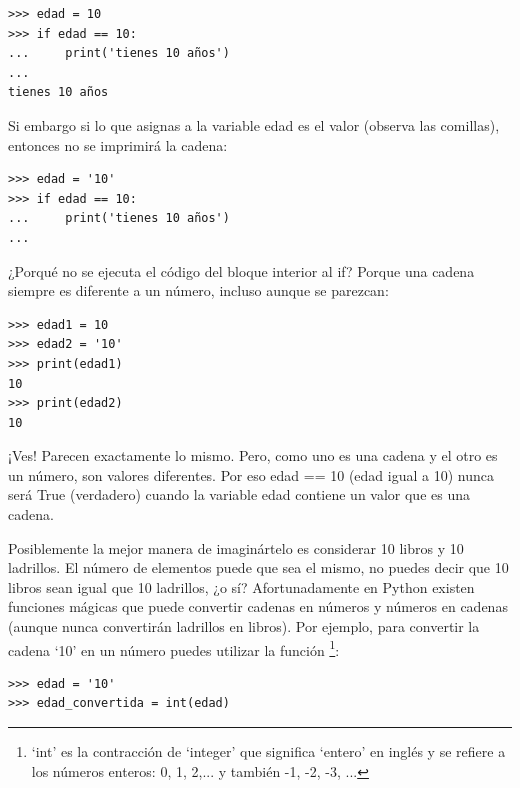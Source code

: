 \begin{listing}
\begin{verbatim}
>>> edad = 10
>>> if edad == 10:
...     print('tienes 10 años')
...
tienes 10 años
\end{verbatim}
\end{listing}

Si embargo si lo que asignas a la variable edad es el valor  (observa las comillas), entonces no se imprimirá la cadena:

\begin{listing}
\begin{verbatim}
>>> edad = '10'
>>> if edad == 10:
...     print('tienes 10 años')
...
\end{verbatim}
\end{listing}

¿Porqué no se ejecuta el código del bloque interior al if?  Porque una cadena siempre es diferente a un número, incluso aunque se parezcan:

\begin{listing}
\begin{verbatim}
>>> edad1 = 10
>>> edad2 = '10'
>>> print(edad1)
10
>>> print(edad2)
10
\end{verbatim}
\end{listing}

¡Ves!  Parecen exactamente lo mismo.  Pero, como uno es una cadena y el otro es un número, son valores diferentes.  Por eso edad == 10 (edad igual a 10) nunca será True (verdadero) cuando la variable edad contiene un valor que es una cadena.
\par
Posiblemente la mejor manera de imaginártelo es considerar 10 libros y 10 ladrillos.  El número de elementos puede que sea el mismo, no puedes decir que 10 libros sean igual que 10 ladrillos, ¿o sí?  Afortunadamente en Python existen funciones mágicas que puede convertir cadenas en números y números en cadenas (aunque nunca convertirán ladrillos en libros). Por ejemplo, para convertir la cadena `10' en un número puedes utilizar la función \footnote{`int' es la contracción de `integer' que significa `entero' en inglés y se refiere a los números enteros: 0, 1, 2,... y también -1, -2, -3, ...}:

\begin{listing}
\begin{verbatim}
>>> edad = '10'
>>> edad_convertida = int(edad)
\end{verbatim}
\end{listing}

